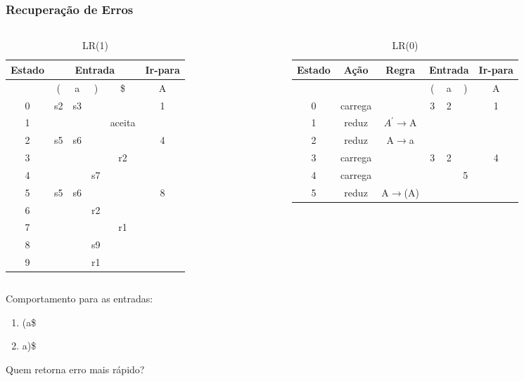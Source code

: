 \documentclass[table]{beamer}
\begin{document}
\begin{frame}
   \frametitle{Recuperação de Erros}
   \begin{columns}
      \begin{column}{0.4\textwidth}
         \tiny
\begin{table}
\begin{tabular}{|c|c|c|c|c|c|}
\hline
\textbf{Estado} & \multicolumn{4}{c|}{\textbf{Entrada}} & \textbf{Ir-para} \\
\hline 
& (  & a  & )  & \$     & A  \\
\hline
0 & s2 & s3 &    &        & 1  \\
1 &    &    &    & aceita &    \\
2 & s5 & s6 &    &        & 4  \\
3 &    &    &    & r2     &    \\
4 &    &    & s7 &        &    \\
5 & s5 & s6 &    &        & 8  \\
6 &    &    & r2 &        &    \\
7 &    &    &    & r1     &    \\
8 &    &    & s9 &        &    \\
9 &    &    & r1 &        &    \\
\hline
\end{tabular}
\caption{LR(1)}
\end{table}
      \end{column}
      \begin{column}{0.6\textwidth}
         \tiny
\begin{table}
\begin{tabular}{|c|c|c|c|c|c|c|}
\hline
\textbf{Estado} & \textbf{Ação} & \textbf{Regra} &\multicolumn{3}{c|}{\textbf{Entrada}} & \textbf{Ir-para} \\
\hline 
\multicolumn{3}{|c|}{} &(&a&)&A\\
\hline
0 & carrega & & 3 & 2 & & 1 \\
1 & reduz & $A^{'}$$\rightarrow$A &  &  & &  \\
2 & reduz & A$\rightarrow$a &  &  & &  \\
3 & carrega & & 3 & 2 & & 4 \\
4 & carrega & & & & 5 & \\
5 & reduz & A$\rightarrow$(A)& & & & \\
\hline
\end{tabular}
\caption{LR(0)}

\end{table}
   \end{column}
   \end{columns}
   Comportamento para as entradas:
   \begin{enumerate}
      \item (a\$
      \item a)\$
   \end{enumerate}
   Quem retorna erro mais rápido?
\end{frame}
\end{document}
